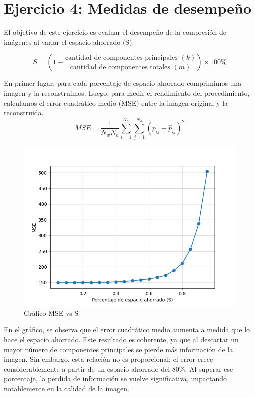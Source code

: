 \documentclass[a4paper,12pt]{article}
\begin{document}
\newpage
\section*{Ejercicio 4: Medidas de desempeño}
El objetivo de este ejercicio es evaluar el desempeño de la compresión de imágenes al variar el espacio ahorrado (S). 

\begin{equation}
S = \left( 1 - \frac{\text{cantidad de componentes principales } (k)}{\text{cantidad de componentes totales } (m)} \right) \times 100 \%
\end{equation}

En primer lugar, para cada porcentaje de espacio ahorrado comprimimos una imagen y la reconstruimos. Luego, para 
medir el rendimiento del procedimiento, calculamos el error cuadrático medio (MSE) entre la imagen original y 
la reconstruida. 
\begin{equation}
MSE = \frac{1}{N_w N_h} \sum_{i=1}^{N_w} \sum_{j=1}^{N_h} (p_{ij} - \hat{p}_{ij})^2
\end{equation}

\begin{figure}[H]
    \centering
    \includegraphics[width=1\textwidth]{Ejercicio 4a.png}
    \caption{Gráfico MSE vs S}
    \label{fig:ej4}
\end{figure}

En el gráfico, se observa que el error cuadrático medio aumenta a medida que lo hace el espacio ahorrado.
Este resultado es coherente, ya que al descartar un mayor número de componentes principales se pierde más 
información de la imagen. 
Sin embargo, esta relación no es proporcional: el error crece considerablemente a partir de un espacio 
ahorrado del 80\%. Al superar ese porcentaje, la pérdida de información se vuelve significativa, 
impactando notablemente en la calidad de la imagen. 
\end{document}
